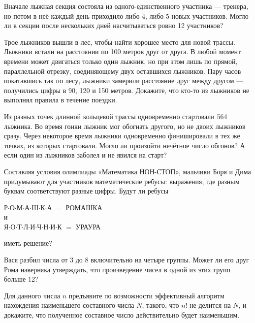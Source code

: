 \begin{itemize}
\itA Вначале лыжная секция состояла из одного-единственного участника — тренера, но потом в неё каждый день приходило либо 4, либо 5 новых участников. Могло ли в секции после нескольких дней насчитываться ровно 12 участников?

\itB Трое лыжников вышли в лес, чтобы найти хорошее место для новой трассы. Лыжники встали на расстоянии по 100 метров друг от друга. В любой момент времени может двигаться только один лыжник, но при этом лишь по прямой, параллельной отрезку, соединяющему двух оставшихся лыжников. Пару часов покатавшись так по лесу, лыжники замерили расстояние друг между другом — получились цифры в 90, 120 и 150 метров. Докажите, что кто-то из лыжников не выполнял правила в течение поездки.

\itC Из разных точек длинной кольцевой трассы одновременно стартовали 564 лыжника. Во время гонки лыжник мог обогнать другого, но не двоих лыжников сразу. Через некоторое время лыжники одновременно финишировали в тех же точках, из которых стартовали. Могло ли произойти нечётное число обгонов? А если один из лыжников заболел и не явился на старт?
\end{itemize}

\begin{itemize}
\itA Составляя условия олимпиады «Математика НОН-СТОП», мальчики Боря и Дима придумывают для участников математические ребусы: выражения, где разным буквам соответствуют разные цифры. Будут ли ребусы
\begin{center}
	Р$\cdot$О$\cdot$М$\cdot$А$\cdot$Ш$\cdot$К$\cdot$А $=$ РОМАШКА\\
	и \\
	Я$\cdot$О$\cdot$Т$\cdot$Л$\cdot$И$\cdot$Ч$\cdot$Н$\cdot$И$\cdot$К $=$ УРАУРА
\end{center}
иметь решение?

\itB Вася разбил числа от 3 до 8 включительно на четыре группы. Может ли его друг Рома наверняка утверждать, что произведение чисел в одной из этих групп больше 12?

\itC Для данного числа $n$ предъявите по возможности эффективный алгоритм нахождения 
наименьшего составного числа $N$, такого, 
что $n!$ не делится на $N$, и докажите, что полученное составное число действительно будет 
наименьшим.
\end{itemize}

